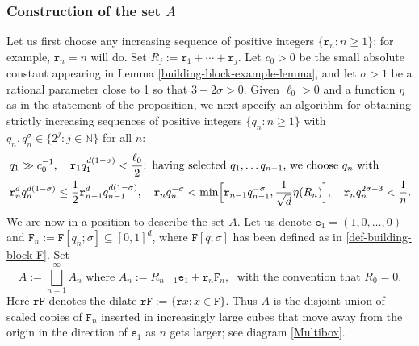 \documentclass[a4paper,11pt]{amsart}
\numberwithin{equation}{section}
\begin{document}
\subsubsection{Construction of the set $A$}
Let us first choose any increasing sequence of positive integers $\{\mathtt r_n : n \geq 1\}$; for example, $\mathtt r_n = n$ will do. Set $ R_j := \mathtt r_1 + \cdots + \mathtt r_j$. 
Let $c_0 > 0$ be the small absolute constant appearing in Lemma \ref{building-block-example-lemma}, and let $\sigma > 1$ be a rational parameter close to 1 so that $3 - 2 \sigma > 0$.  Given $\ell_0 > 0$ and a function $\eta$ as in the statement of the proposition, we next specify an algorithm for obtaining strictly increasing sequences of positive integers $\{q_n : n \geq 1\}$ with $q_n, q_n^{\sigma} \in \{2^{j} :j \in \mathbb N\}$ for all $n$:
 \begin{align}  
 &q_1 \gg c_{0}^{-1}, \quad \mathtt r_1q_1^{d(1 - \sigma)} < \frac{\ell_0}{2}; \text{ having selected $q_1, \ldots q_{n-1}$, we choose $q_n$ with } \label{r1q1}\\  
 &\mathtt r_{n}^d q_{n}^{d(1 - \sigma)} \leq \frac{1}{2}\mathtt r_{n-1}^d q_{n-1}^{d(1 - \sigma)}, \quad \mathtt r_n q_n^{-\sigma} < \min \Bigl[\mathtt r_{n-1} q_{n-1}^{-\sigma}, \frac{1}{\sqrt{d}}\eta(R_n) \Bigr], \quad \mathtt r_n q_n^{2 \sigma -3} < \frac{1}{n}. \label{rnqn-choice}
 \end{align}  
 We are now in a position to describe the set $A$. Let us denote $\mathtt e_1 = (1, 0, \ldots, 0)$ and $\mathtt F_n := \mathtt F[q_n; \sigma] \subseteq [0,1]^d$, where $\mathtt F[q; \sigma]$ has been defined as in \eqref{def-building-block-F}. Set 
\begin{equation} \label{def-A-all-distances}
A := \bigsqcup_{n=1}^{\infty} A_n \text{ where } A_n := R_{n-1} \mathtt e_1 + \mathtt r_n \mathtt F_n, \; \text{ with the convention that } R_0 = 0.  
\end{equation} 
Here $\mathtt r \mathtt F$ denotes the dilate $\mathtt r \mathtt F := \{\mathtt r x : x \in \mathtt F \}$. Thus $A$ is the disjoint union of scaled copies of $\mathtt F_n$ inserted in increasingly large cubes that move away from the origin in the direction of $\mathtt e_1$ as $n$ gets larger; see diagram \ref{Multibox}. 
\end{document}

